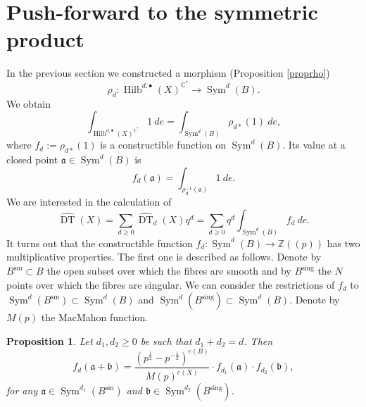 \documentclass{amsart}
\newtheorem{proposition}[theorem]{Proposition}
\theoremstyle{definition}
\newcommand{\CC} {\mathbb{C}}          %
\newcommand{\ZZ} {\mathbb{Z}}		%
\newcommand{\Sym}{\operatorname{Sym}}
\newcommand{\Hilb}{\operatorname{Hilb}}
\newcommand{\DT}{\operatorname{DT}}
\newcommand{\sm}{\operatorname{sm}}
\newcommand{\sing}{\operatorname{sing}}
\begin{document}


\section{Push-forward to the symmetric product} \label{sym}

In the previous section we constructed a morphism (Proposition \ref{proprho}) 
\begin{equation} \label{rho}
\rho_{d} : \Hilb^{d,\bullet}(X)^{\CC^*} \longrightarrow \Sym^d(B).
\end{equation}
We obtain
$$
\int_{\Hilb^{d,\bullet}(X)^{\CC^*}} 1 \ de = \int_{\Sym^d(B)} \rho_{d*}(1) \ de,
$$
where $f_d := \rho_{d*}(1)$ is a constructible function on $\Sym^d(B)$. Its value at a closed point $\mathfrak{a} \in \Sym^d(B)$ is 
$$
f_d(\mathfrak{a}) = \int_{\rho_{d}^{-1}(\mathfrak{a})} 1 \ de.
$$
We are interested in the calculation of
$$
\widehat{\DT}(X) = \sum_{d \geq 0} \widehat{\DT}_d(X) q^d =\sum_{d \geq 0} q^d \int_{\Sym^d(B)} f_d \ de.
$$
It turns out that the constructible function $f_d : \Sym^d(B) \rightarrow \ZZ(\!(p)\!)$ has two multiplicative properties. The first one is described as follows. Denote by $B^{\sm} \subset B$ the open subset over which the fibres are smooth and by $B^{\sing}$ the $N$ points over which the fibres are singular. We can consider the restrictions of $f_d$ to $\Sym^d(B^{\sm}) \subset \Sym^d(B)$ and $\Sym^d(B^{\sing}) \subset \Sym^d(B)$. Denote by $M(p)$ the MacMahon function.
\begin{proposition} \label{mult1}
Let $d_1, d_2 \geq 0$ be such that $d_1+d_2 = d$. Then 
$$ 
f_d(\mathfrak{a} + \mathfrak{b}) =\frac{(p^{\frac{1}{2}} - p^{-\frac{1}{2}})^{e(B)}}{M(p)^{e(X)}} \cdot f_{d_1}(\mathfrak{a}) \cdot f_{d_2}(\mathfrak{b}), 
$$
for any $\mathfrak{a} \in \Sym^{d_1}(B^{\sm})$ and $\mathfrak{b} \in \Sym^{d_2}(B^{\sing})$. 
\end{proposition}
\end{document}
